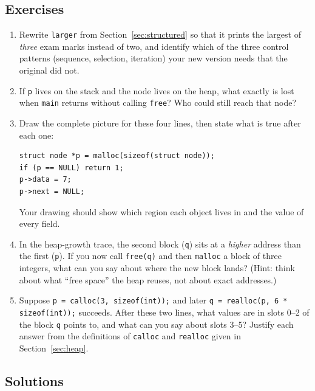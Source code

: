 \documentclass[11pt]{article}
\begin{document}
\subsection*{Exercises}

\begin{enumerate}
  \item Rewrite \texttt{larger} from Section~\ref{sec:structured} so that it
    prints the largest of \emph{three} exam marks instead of two, and identify
    which of the three control patterns (sequence, selection, iteration) your
    new version needs that the original did not.
  \item If \texttt{p} lives on the stack and the node lives on the heap, what
    exactly is lost when \texttt{main} returns without calling \texttt{free}?
    Who could still reach that node?
  \item Draw the complete picture for these four lines, then state what is true
    after each one:
{\footnotesize
\begin{verbatim}
struct node *p = malloc(sizeof(struct node));
if (p == NULL) return 1;
p->data = 7;
p->next = NULL;
\end{verbatim}
}
    Your drawing should show which region each object lives in and the value of
    every field.
  \item In the heap-growth trace, the second block (\texttt{q}) sits at a
    \emph{higher} address than the first (\texttt{p}). If you now call
    \texttt{free(q)} and then \texttt{malloc} a block of three integers, what
    can you say about where the new block lands? (Hint: think about what
    ``free space'' the heap reuses, not about exact addresses.)
  \item Suppose \texttt{p = calloc(3, sizeof(int));} and later
    \texttt{q = realloc(p, 6 * sizeof(int));} succeeds. After these two lines,
    what values are in slots 0--2 of the block \texttt{q} points to, and what
    can you say about slots 3--5? Justify each answer from the definitions of
    \texttt{calloc} and \texttt{realloc} given in Section~\ref{sec:heap}.
\end{enumerate}

\subsection*{Solutions}
\end{document}
